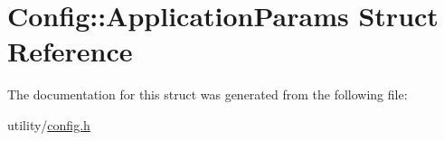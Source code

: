 \hypertarget{struct_config_1_1_application_params}{}\section{Config\+:\+:Application\+Params Struct Reference}
\label{struct_config_1_1_application_params}


The documentation for this struct was generated from the following file\+:\begin{DoxyCompactItemize}
\item 
utility/\hyperlink{config_8h}{config.\+h}\end{DoxyCompactItemize}
